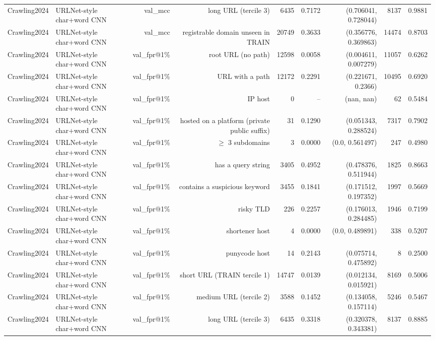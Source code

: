 \begin{table}[t]
\begin{tabular}{llrrrrrrr}
Crawling2024 & URLNet-style char+word CNN & val\_mcc & long URL (tercile 3) & 6435 & 0.7172 & (0.706041, 0.728044) & 8137 & 0.9881 \\
Crawling2024 & URLNet-style char+word CNN & val\_mcc & registrable domain unseen in TRAIN & 20749 & 0.3633 & (0.356776, 0.369863) & 14474 & 0.8703 \\
Crawling2024 & URLNet-style char+word CNN & val\_fpr@1\% & root URL (no path) & 12598 & 0.0058 & (0.004611, 0.007279) & 11057 & 0.6262 \\
Crawling2024 & URLNet-style char+word CNN & val\_fpr@1\% & URL with a path & 12172 & 0.2291 & (0.221671, 0.2366) & 10495 & 0.6920 \\
Crawling2024 & URLNet-style char+word CNN & val\_fpr@1\% & IP host & 0 & -- & (nan, nan) & 62 & 0.5484 \\
Crawling2024 & URLNet-style char+word CNN & val\_fpr@1\% & hosted on a platform (private public suffix) & 31 & 0.1290 & (0.051343, 0.288524) & 7317 & 0.7902 \\
Crawling2024 & URLNet-style char+word CNN & val\_fpr@1\% & $\geq$ 3 subdomains & 3 & 0.0000 & (0.0, 0.561497) & 247 & 0.4980 \\
Crawling2024 & URLNet-style char+word CNN & val\_fpr@1\% & has a query string & 3405 & 0.4952 & (0.478376, 0.511944) & 1825 & 0.8663 \\
Crawling2024 & URLNet-style char+word CNN & val\_fpr@1\% & contains a suspicious keyword & 3455 & 0.1841 & (0.171512, 0.197352) & 1997 & 0.5669 \\
Crawling2024 & URLNet-style char+word CNN & val\_fpr@1\% & risky TLD & 226 & 0.2257 & (0.176013, 0.284485) & 1946 & 0.7199 \\
Crawling2024 & URLNet-style char+word CNN & val\_fpr@1\% & shortener host & 4 & 0.0000 & (0.0, 0.489891) & 338 & 0.5207 \\
Crawling2024 & URLNet-style char+word CNN & val\_fpr@1\% & punycode host & 14 & 0.2143 & (0.075714, 0.475892) & 8 & 0.2500 \\
Crawling2024 & URLNet-style char+word CNN & val\_fpr@1\% & short URL (TRAIN tercile 1) & 14747 & 0.0139 & (0.012134, 0.015921) & 8169 & 0.5006 \\
Crawling2024 & URLNet-style char+word CNN & val\_fpr@1\% & medium URL (tercile 2) & 3588 & 0.1452 & (0.134058, 0.157114) & 5246 & 0.5467 \\
Crawling2024 & URLNet-style char+word CNN & val\_fpr@1\% & long URL (tercile 3) & 6435 & 0.3318 & (0.320378, 0.343381) & 8137 & 0.8885 \\

\end{tabular}
\end{table}
